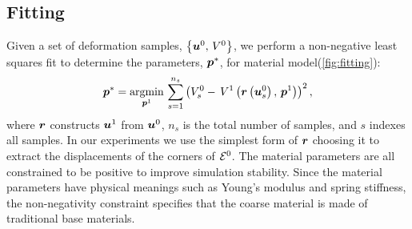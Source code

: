 \subsection{Fitting}
\label{sec:fitting}
Given a set of deformation samples, $\left\{ \bm{u}^0, \,V^0\right\}$, we perform a non-negative least squares fit to determine the parameters, $\bm{p}^*$, for material model(\autoref{fig:fitting}):
\begin{align}
\bm{p}^*= \underset{\bm{p}^1}{\operatorname{argmin}} \, \sum_{s=1}^{n_s}\left(V_s^0- \, V^1\left(\bm{r}\left(\bm{u}_s^0\right), \, \bm{p}^1\right)\right)^2,
\label{eq:fitting}
\end{align}
where $\bm{r}$ constructs $\bm{u}^1$ from $\bm{u}^0$, $n_s$ is the total number of samples, and $s$ indexes all samples. In our experiments we use the simplest form of $\bm{r}$ choosing it to extract the displacements of the corners of $\mathcal{E}^0$.
The material parameters are all constrained to be positive to improve simulation stability.
Since the material parameters have physical meanings such as Young's modulus and spring stiffness,
the non-negativity constraint specifies that the coarse material is made of traditional base materials.

